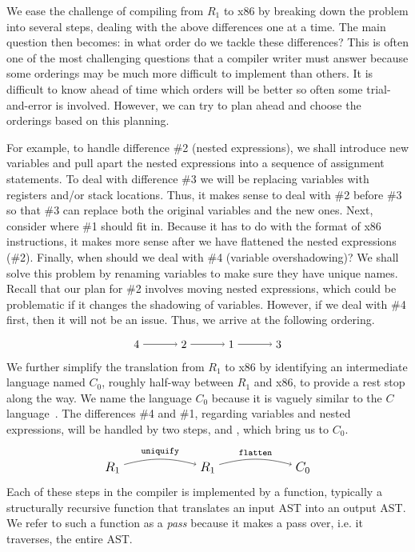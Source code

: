 \documentclass[11pt]{book}
\begin{document}
We ease the challenge of compiling from $R_1$ to x86 by breaking down
the problem into several steps, dealing with the above differences one
at a time. The main question then becomes: in what order do we tackle
these differences? This is often one of the most challenging questions
that a compiler writer must answer because some orderings may be much
more difficult to implement than others. It is difficult to know ahead
of time which orders will be better so often some trial-and-error is
involved. However, we can try to plan ahead and choose the orderings
based on this planning.

For example, to handle difference \#2 (nested expressions), we shall
introduce new variables and pull apart the nested expressions into a
sequence of assignment statements.  To deal with difference \#3 we
will be replacing variables with registers and/or stack
locations. Thus, it makes sense to deal with \#2 before \#3 so that
\#3 can replace both the original variables and the new ones. Next,
consider where \#1 should fit in. Because it has to do with the format
of x86 instructions, it makes more sense after we have flattened the
nested expressions (\#2). Finally, when should we deal with \#4
(variable overshadowing)?  We shall solve this problem by renaming
variables to make sure they have unique names. Recall that our plan
for \#2 involves moving nested expressions, which could be problematic
if it changes the shadowing of variables. However, if we deal with \#4
first, then it will not be an issue.  Thus, we arrive at the following
ordering.
\[
\begin{tikzpicture}[baseline=(current  bounding  box.center)]
\foreach \i/\p in {4/1,2/2,1/3,3/4}
{
  \node (\i) at (\p*1.5,0) {$\i$};
}
\foreach \x/\y in {4/2,2/1,1/3}
{
  \draw[->] (\x) to (\y);
}
\end{tikzpicture}
\]
We further simplify the translation from $R_1$ to x86 by identifying
an intermediate language named $C_0$, roughly half-way between $R_1$
and x86, to provide a rest stop along the way. We name the language
$C_0$ because it is vaguely similar to the $C$
language~\citep{Kernighan:1988nx}. The differences \#4 and \#1,
regarding variables and nested expressions, will be handled by two
steps,  and , which bring us to
$C_0$.
\[
\begin{tikzpicture}[baseline=(current  bounding  box.center)]
\foreach \i/\p in {R_1/1,R_1/2,C_0/3}
{
  \node (\p) at (\p*3,0) {\large $\i$};
}
\foreach \x/\y/\lbl in {1/2/uniquify,2/3/flatten}
{
 \path[->,bend left=15] (\x) edge [above] node {\ttfamily\footnotesize \lbl} (\y);
}
\end{tikzpicture}
\]
Each of these steps in the compiler is implemented by a function,
typically a structurally recursive function that translates an input
AST into an output AST. We refer to such a function as a \emph{pass}
because it makes a pass over, i.e. it traverses, the entire AST.
\end{document}
